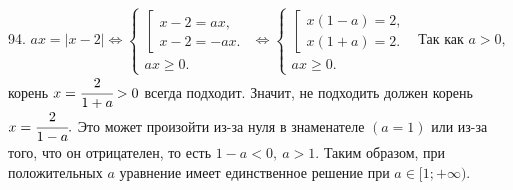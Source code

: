 94. $ax=|x-2|\Leftrightarrow \begin{cases}\left[\begin{array}{l}x-2=ax,\\ x-2=-ax.\end{array}\right.\\ ax\geqslant0.\end{cases}\Leftrightarrow
\begin{cases}\left[\begin{array}{l}x(1-a)=2,\\ x(1+a)=2.\end{array}\right.\\ ax\geqslant0.\end{cases}$
Так как $a>0,$ корень $x=\cfrac{2}{1+a}>0$ всегда подходит. Значит, не подходить должен корень $x=\cfrac{2}{1-a}.$ Это может произойти из-за нуля в знаменателе $(a=1)$ или из-за того, что он отрицателен, то есть $1-a<0,\ a>1.$ Таким образом, при положительных $a$ уравнение имеет единственное решение при $a\in[1;+\infty).$\\
